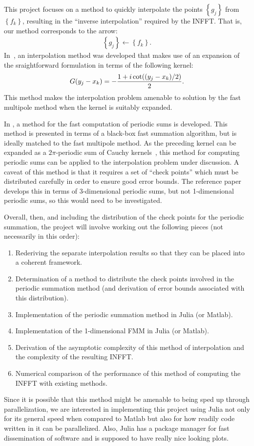 \documentclass{article}
\begin{document}
This project focuses on a method to quickly interpolate the points
$\left\{g_j\right\}$
from $\left\{f_k\right\}$,
resulting in the ``inverse interpolation'' required by the INFFT.\@
That is, our method corresponds to the arrow:
\begin{align*}
  \left\{g_j\right\} \longleftarrow \left\{f_k\right\}.
\end{align*}
In~\cite{Dutt95fastfourierII}, an interpolation method was developed
that makes use of an expansion of the sraightforward formulation in
terms of the following kernel:
\begin{align}
  G(y_j - x_k) = - {1 + i \cot((y_j - x_k)/2) \over 2}.
\end{align}
This method makes the interpolation problem amenable to solution by
the fast multipole method when the kernel is suitably expanded.

In \cite{Gumerov13amethod}, a method for the fast computation of
periodic sums is developed. This method is presented in terms of a
black-box fast summation algorithm, but is ideally matched to the fast
multipole method. As the preceding kernel can be expanded as a
$2\pi$-periodic
sum of Cauchy kernels~\cite{fmmfiltering}, this method for computing
periodic sums can be applied to the interpolation problem under
discussion. A caveat of this method is that it requires a set of
``check points'' which must be distributed carefully in order to
ensure good error bounds. The reference paper develops this in terms
of 3-dimensional periodic sums, but not 1-dimensional periodic sums,
so this would need to be investigated.

Overall, then, and including the distribution of the check points for
the periodic summation, the project will involve working out the
following pieces (not necessarily in this order):
\begin{enumerate}
\item Rederiving the separate interpolation results so that they can
  be placed into a coherent framework.
\item Determination of a method to distribute the check points
  involved in the periodic summation method (and derivation of error
  bounds associated with this distribution).
\item Implementation of the periodic summation method in Julia (or Matlab).
\item Implementation of the 1-dimensional FMM in Julia (or Matlab).
\item Derivation of the asymptotic complexity of this method of
  interpolation and the complexity of the resulting INFFT.\@
\item Numerical comparison of the performance of this method of
  computing the INFFT with existing methods.
\end{enumerate}
Since it is possible that this method might be amenable to being sped
up through parallelization, we are interested in implementing this
project using Julia not only for its general speed when compared to
Matlab but also for how readily code written in it can be
parallelized. Also, Julia has a package manager for fast dissemination
of software and is supposed to have really nice looking plots.
\end{document}
